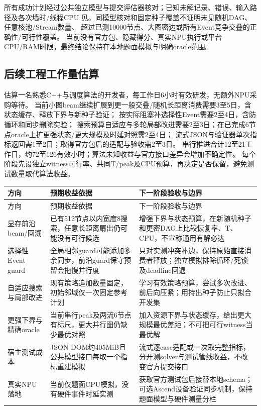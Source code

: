 \documentclass[UTF8,a4paper,11pt,fontset=fandol]{ctexart}
\begin{document}
所有成功计划经过公共独立模型与提交评估器核对；已知未解记录、错误、输入路径及各次墙时/线程CPU
见。同模型核对和固定种子覆盖不证明未见随机DAG、任意核池/Stream数量、
超过已测10000节点、大图密边或所有Event竞争交叠的正确性/可行性覆盖。
当前没有官方包、隐藏得分、真实NPU执行或平台CPU/RAM时限，最终结论保持在本地题面模拟与明确oracle范围。

\subsection{后续工程工作量估算}
估算一名熟悉C++与调度算法的开发者，每工作日6小时有效研发，无额外NPU采购等待。
当前小图beam继续扩展到更一般交叠/随机长距离消费需要3至5日，含状态缓存、释放下界与新种子验证；
按实际阻塞补选择性Event需要2至4日，含防循环和同步删除实验；
搜索预算自适应与多轮局部改进需要2至3日；在已完成6节点oracle上扩更强状态/更大规模及时延对照需2至4日；
流式JSON与验证器单次指标返回需1至2日；取得官方包后的适配与验收需2至3日。
串行推进合计12至21工作日，约72至126有效小时；算法未知收益与官方接口差异会增加不确定性。
每个阶段先设独立witness可行率、共同T/peak及CPU预算，再决定是否保留，避免测试数量取代算法收益。

\begin{longtable}{>{\raggedright\arraybackslash}p{3.0cm}>{\raggedright\arraybackslash}p{5.2cm}>{\raggedright\arraybackslash}p{5.6cm}}
\toprule
方向 & 预期收益依据 & 下一阶段验收与边界\\\midrule
\endfirsthead
\toprule
方向 & 预期收益依据 & 下一阶段验收与边界\\\midrule
\endhead
\bottomrule
\endfoot
显存前沿beam/回溯 & 已有512节点以内宽度8搜索，任意长距离扇出仍可能没有可行候选 & 增强下界与状态预算，在新随机种子和更密DAG上比较恢复率、T、CPU，不宣称通用有解必达\\
选择性Event guard & 全局相邻guard可能添加多余同步，前沿guard保守预留会拖慢并行度 & 只对实测冲突补边，保持原始直接消费者释放；独立模拟排除循环/死锁及deadline回退\\
自适应搜索与局部改进 & 现有策略追加数量固定，初始邻域仅一次固定参考计划 & 学习有效策略预算，尝试多次改进、前后向压紧；用持出种子防止只拟合开发集\\
更强下界与精确oracle & 当前串行peak及两流6节点有标尺，更大并行图仍缺少最优对照 & 加入资源下界与状态缓存，给出更大规模最优差距；不可把可行witness当最优解\\
宿主测试成本 & JSON DOM约405MiB且公共模型接口每取一个指标重建模拟 & 流式逐case适配或一次取完整指标，分开测solver与测试管线收益，不改变官方提交接口\\
真实NPU落地 & 当前仅题面CPU模拟，没有硬件事件时延实测 & 获取官方测试包后接替本地schema；可选Ascend设备验证同步机制，保持题面模型与硬件测量分栏\\
\end{longtable}
\end{document}
